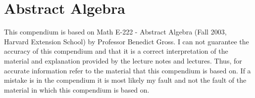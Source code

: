 \chapter{Abstract Algebra}
This compendium is based on Math E-222 - Abstract Algebra (Fall 2003, Harvard Extension School) by Professor Benedict Gross.
I can not guarantee the accuracy of this compendium and that it is a correct interpretation of the material and explanation provided by the lecture notes and lectures. Thus, for accurate information refer to the material that this compendium is based on. If a mistake is in the compendium it is most likely my fault and not the fault of the material in which this compendium is based on.


